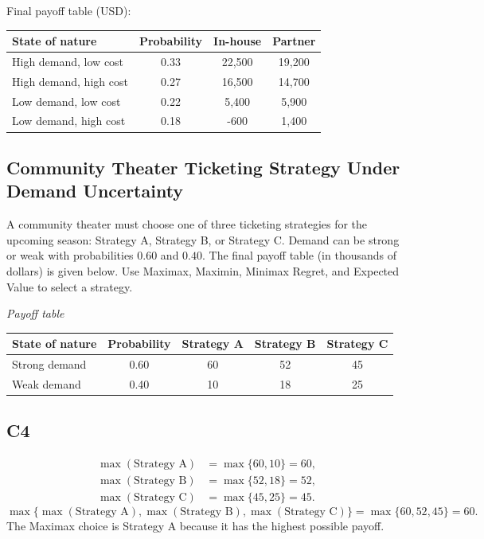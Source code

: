 \begin{ExamProblems}
		Final payoff table (USD):
		\begin{center}
			\begin{tabular}{l c c c}
				\toprule
				State of nature & Probability & In-house & Partner \\
				\midrule
				High demand, low cost & 0.33 & 22{,}500 & 19{,}200 \\
				High demand, high cost & 0.27 & 16{,}500 & 14{,}700 \\
				Low demand, low cost & 0.22 & 5{,}400 & 5{,}900 \\
				Low demand, high cost & 0.18 & -600 & 1{,}400 \\
				\bottomrule
			\end{tabular}
		\end{center}
		
		\item
		\subsection*{Community Theater Ticketing Strategy Under Demand Uncertainty}
		A community theater must choose one of three ticketing strategies for the upcoming season: Strategy A, Strategy B,
		or Strategy C. Demand can be strong or weak with probabilities $0.60$ and $0.40$. The final payoff table (in thousands of dollars)
		is given below. Use Maximax, Maximin, Minimax Regret, and Expected Value to select a strategy.
		
		\begin{center}
			\textit{Payoff table} \\
			\begin{tabular}{l c c c c}
				\toprule
				State of nature & Probability & Strategy A & Strategy B & Strategy C \\
				\midrule
				Strong demand & 0.60 & 60 & 52 & 45 \\
				Weak demand & 0.40 & 10 & 18 & 25 \\
				\bottomrule
			\end{tabular}
		\end{center}
		
		\subsection*{C4}
		\[
		\begin{aligned}
		\max(\text{Strategy A}) &= \max\{60,10\} = 60,\\
		\max(\text{Strategy B}) &= \max\{52,18\} = 52,\\
		\max(\text{Strategy C}) &= \max\{45,25\} = 45.
		\end{aligned}
		\]
		\[
		\max\{\max(\text{Strategy A}), \max(\text{Strategy B}), \max(\text{Strategy C})\}
		= \max\{60, 52, 45\}
		= 60.
		\]
		The Maximax choice is Strategy A because it has the highest possible payoff.
		

\end{ExamProblems}
